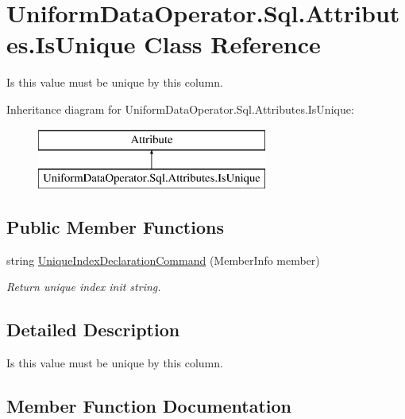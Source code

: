 \hypertarget{class_uniform_data_operator_1_1_sql_1_1_attributes_1_1_is_unique}{}\section{Uniform\+Data\+Operator.\+Sql.\+Attributes.\+Is\+Unique Class Reference}
\label{class_uniform_data_operator_1_1_sql_1_1_attributes_1_1_is_unique}


Is this value must be unique by this column.  


Inheritance diagram for Uniform\+Data\+Operator.\+Sql.\+Attributes.\+Is\+Unique\+:\begin{figure}[H]
\begin{center}
\leavevmode
\includegraphics[height=2.000000cm]{d0/d90/class_uniform_data_operator_1_1_sql_1_1_attributes_1_1_is_unique}
\end{center}
\end{figure}
\subsection*{Public Member Functions}
\begin{DoxyCompactItemize}
\item 
string \mbox{\hyperlink{class_uniform_data_operator_1_1_sql_1_1_attributes_1_1_is_unique_aff4e39a64a247b951300a64992c72238}{Unique\+Index\+Declaration\+Command}} (Member\+Info member)
\begin{DoxyCompactList}\small\item\em Return unique index init string. \end{DoxyCompactList}\end{DoxyCompactItemize}


\subsection{Detailed Description}
Is this value must be unique by this column. 



\subsection{Member Function Documentation}
\mbox{\label{class_uniform_data_operator_1_1_sql_1_1_attributes_1_1_is_unique_aff4e39a64a247b951300a64992c72238}} 

